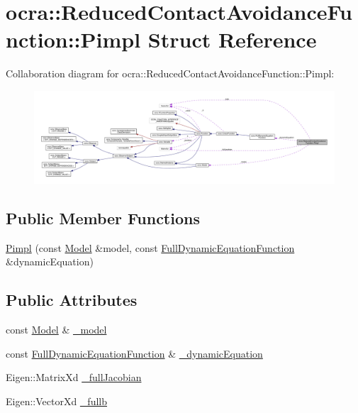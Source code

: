 \hypertarget{structReducedContactAvoidanceFunction_1_1Pimpl}{}\section{ocra\+:\+:Reduced\+Contact\+Avoidance\+Function\+:\+:Pimpl Struct Reference}
\label{structReducedContactAvoidanceFunction_1_1Pimpl}


Collaboration diagram for ocra\+:\+:Reduced\+Contact\+Avoidance\+Function\+:\+:Pimpl\+:\nopagebreak
\begin{figure}[H]
\begin{center}
\leavevmode
\includegraphics[width=350pt]{d9/d98/structReducedContactAvoidanceFunction_1_1Pimpl__coll__graph}
\end{center}
\end{figure}
\subsection*{Public Member Functions}
\begin{DoxyCompactItemize}
\item 
\hyperlink{structReducedContactAvoidanceFunction_1_1Pimpl_ab7258766eea3fd037b4e59e381adfdd5}{Pimpl} (const \hyperlink{classocra_1_1Model}{Model} \&model, const \hyperlink{classocra_1_1FullDynamicEquationFunction}{Full\+Dynamic\+Equation\+Function} \&dynamic\+Equation)
\end{DoxyCompactItemize}
\subsection*{Public Attributes}
\begin{DoxyCompactItemize}
\item 
const \hyperlink{classocra_1_1Model}{Model} \& \hyperlink{structReducedContactAvoidanceFunction_1_1Pimpl_acd2bf5f47839d39cb37ac323e038558f}{\+\_\+model}
\item 
const \hyperlink{classocra_1_1FullDynamicEquationFunction}{Full\+Dynamic\+Equation\+Function} \& \hyperlink{structReducedContactAvoidanceFunction_1_1Pimpl_a2993139449f5c29b4a85a9e3c261834c}{\+\_\+dynamic\+Equation}
\item 
Eigen\+::\+Matrix\+Xd \hyperlink{structReducedContactAvoidanceFunction_1_1Pimpl_a6ddc277e90776add368eee6a56494f45}{\+\_\+full\+Jacobian}
\item 
Eigen\+::\+Vector\+Xd \hyperlink{structReducedContactAvoidanceFunction_1_1Pimpl_ade6d248f540e91b5b9cfe961981d03a3}{\+\_\+fullb}
\end{DoxyCompactItemize}


